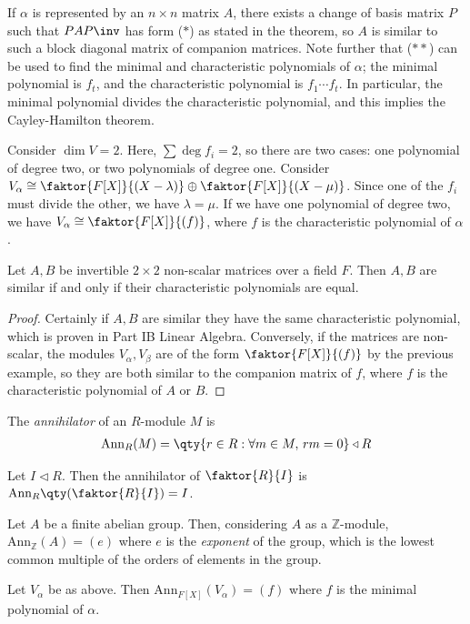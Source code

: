 \begin{remark}
	If $\alpha$ is represented by an $n \times n$ matrix $A$, there exists a change of basis matrix $P$ such that $PAP\inv$ has form (\(\ast\)) as stated in the theorem, so $A$ is similar to such a block diagonal matrix of companion matrices.
	Note further that (\(\ast\ast\)) can be used to find the minimal and characteristic polynomials of $\alpha$; the minimal polynomial is $f_t$, and the characteristic polynomial is $f_1 \cdots f_t$.
	In particular, the minimal polynomial divides the characteristic polynomial, and this implies the Cayley-Hamilton theorem.
\end{remark}
\begin{example}
	Consider $\dim V = 2$.
	Here, $\sum \deg f_i = 2$, so there are two cases: one polynomial of degree two, or two polynomials of degree one.
	Consider $V_\alpha \cong \faktor{F[X]}{(X-\lambda)} \oplus \faktor{F[X]}{(X-\mu)}$.
	Since one of the $f_i$ must divide the other, we have $\lambda = \mu$.
	If we have one polynomial of degree two, we have $V_\alpha \cong \faktor{F[X]}{(f)}$, where $f$ is the characteristic polynomial of $\alpha$.
\end{example}
\begin{corollary}
	Let $A, B$ be invertible $2 \times 2$ non-scalar matrices over a field $F$.
	Then $A, B$ are similar if and only if their characteristic polynomials are equal.
\end{corollary}
\begin{proof}
	Certainly if $A, B$ are similar they have the same characteristic polynomial, which is proven in Part IB Linear Algebra.
	Conversely, if the matrices are non-scalar, the modules $V_\alpha, V_\beta$ are of the form $\faktor{F[X]}{(f)}$ by the previous example, so they are both similar to the companion matrix of $f$, where $f$ is the characteristic polynomial of $A$ or $B$.
\end{proof}
\begin{definition}
	The \textit{annihilator} of an $R$-module $M$ is
	\begin{align*}
		\mathrm{Ann}_R(M) = \qty{r \in R : \forall m \in M,\, rm = 0} \triangleleft R
	\end{align*}
\end{definition}
\begin{example}
	Let $I \triangleleft R$.
	Then the annihilator of $\faktor{R}{I}$ is $\mathrm{Ann}_R\qty(\faktor{R}{I}) = I$.

	Let $A$ be a finite abelian group.
	Then, considering $A$ as a $\mathbb Z$-module, $\mathrm{Ann}_{\mathbb Z}(A) = (e)$ where $e$ is the \textit{exponent} of the group, which is the lowest common multiple of the orders of elements in the group.

	Let $V_\alpha$ be as above.
	Then $\mathrm{Ann}_{F[X]}(V_\alpha) = (f)$ where $f$ is the minimal polynomial of $\alpha$.
\end{example}

